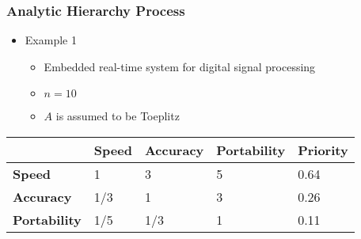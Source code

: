 \documentclass[t,12pt,numbers,fleqn]{beamer}
\begin{document}
\begin{frame}

\frametitle{Analytic Hierarchy Process}

\begin{itemize}
\item Example 1
\begin{itemize}
\item Embedded real-time system for digital signal processing
\item $n = 10$
\item $A$ is assumed to be Toeplitz
\end{itemize}
\end{itemize}

\begin{tabular}{| l | l | l | l | l |}
\hline
~ & \textbf{Speed} & \textbf{Accuracy} & \textbf{Portability} & \textbf{Priority}\\
\hline
\textbf{Speed} & 1 & 3 & 5 & 0.64\\
\textbf{Accuracy} & 1/3 & 1 & 3 & 0.26\\
\textbf{Portability} & 1/5 & 1/3 & 1 & 0.11\\
\hline
\end{tabular}

\end{frame}






\end{document}
